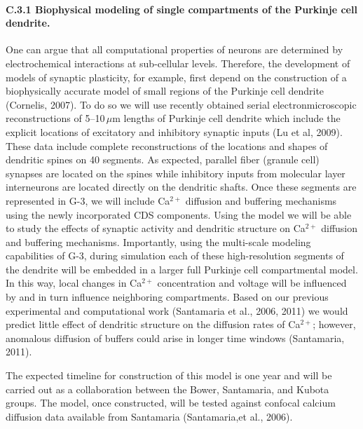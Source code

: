 \documentclass[12pt]{article}
\begin{document}
\paragraph{C.3.1 Biophysical modeling of single compartments of the Purkinje cell dendrite.} One can argue that all computational properties of neurons are determined by electrochemical interactions at sub-cellular levels. Therefore, the development of models of synaptic plasticity, for example, first depend on the construction of a biophysically accurate model of small regions of the Purkinje cell dendrite (Cornelis, 2007). To do so we will use recently obtained serial electronmicroscopic reconstructions of 5--10\,$\mu$m lengths of Purkinje cell dendrite which include the explicit locations of excitatory and inhibitory synaptic inputs (Lu et al, 2009). These data include complete reconstructions of the locations and shapes of dendritic spines on 40 segments. As expected, parallel fiber (granule cell) synapses are located on the spines while inhibitory inputs from molecular layer interneurons are located directly on the dendritic shafts. Once these segments are represented in G-3, we will include Ca$^{2+}$ diffusion and buffering mechanisms using the newly incorporated CDS components. Using the model we will be able to study the effects of synaptic activity and dendritic structure on Ca$^{2+}$ diffusion and buffering mechanisms. Importantly, using the multi-scale modeling capabilities of G-3, during simulation each of these high-resolution segments of the dendrite will be embedded in a larger full Purkinje cell compartmental model. In this way, local changes in Ca$^{2+}$ concentration and voltage will be influenced by and in turn influence neighboring compartments. Based on our previous experimental and computational work (Santamaria et al., 2006, 2011) we would predict little effect of dendritic structure on the diffusion rates of Ca$^{2+}$; however, anomalous diffusion of buffers could arise in longer time windows (Santamaria, 2011).

The expected timeline for construction of this model is one year and will be carried out as a collaboration between the Bower, Santamaria, and Kubota groups. The model, once constructed, will be tested against confocal calcium diffusion data available from Santamaria (Santamaria,et al., 2006).
\end{document}
